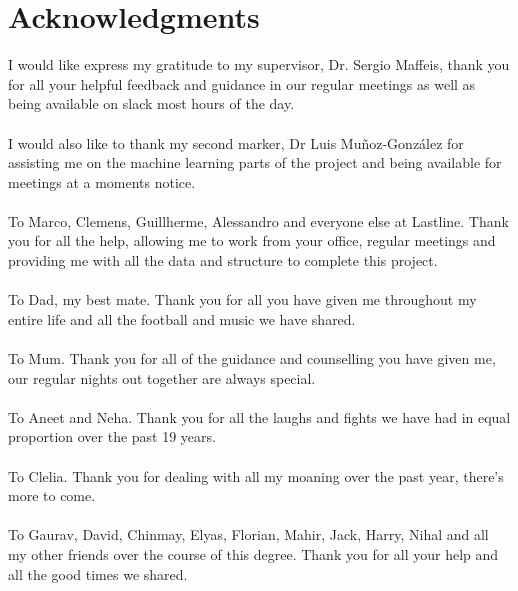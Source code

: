 \documentclass[12pt,twoside]{report}
\begin{document}
\chapter*{Acknowledgments}
I would like express my gratitude to my supervisor, Dr. Sergio Maffeis, thank you for all your helpful feedback and guidance in our regular meetings as well as being available on slack most hours of the day.
\\\\
I would also like to thank my second marker, Dr Luis Muñoz-González for assisting me on the machine learning parts of the project and being available for meetings at a moments notice.
\\\\
To Marco, Clemens, Guillherme, Alessandro and everyone else at Lastline. Thank you for all the help, allowing me to work from your office, regular meetings and providing me with all the data and structure to complete this project.
\\\\
To Dad, my best mate. Thank you for all you have given me throughout my entire life and all the football and music we have shared.
\\\\
To Mum. Thank you for all of the guidance and counselling you have given me, our regular nights out together are always special.
\\\\
To Aneet and Neha. Thank you for all the laughs and fights we have had in equal proportion over the past 19 years.
\\\\
To Clelia. Thank you for dealing with all my moaning over the past year, there's more to come.
\\\\
To Gaurav, David, Chinmay, Elyas, Florian, Mahir, Jack, Harry, Nihal and all my other friends over the course of this degree. Thank you for all your help and all the good times we shared.
\restoregeometry
\clearpage{\pagestyle{empty}\cleardoublepage}
\setcounter{page}{1}
\tableofcontents
\newpage
{}
\end{document}

